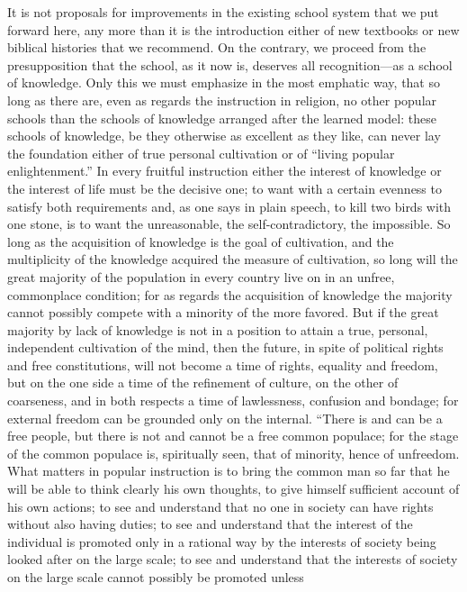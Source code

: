 \documentclass[12pt,a4paper,openany]{book}
\newcommand{\opage}[1]{\marginnote{\footnotesize\textit{[#1]}}}
\begin{document}
It is not proposals for improvements in the existing
school system that we put forward here, any more than
it is the introduction either of new textbooks or new
biblical histories that we recommend. On the contrary, we proceed from
the presupposition that the school, as it now is, deserves all
recognition---as a school of knowledge. Only this we must
emphasize in the most emphatic way, that so long as there are,
even as regards the instruction in religion, no
other popular schools than the schools of knowledge arranged
after the learned model: these schools of knowledge,
be they otherwise as excellent as they like,
can never lay the foundation either of true personal cultivation
or of ``living popular enlightenment.'' In every fruitful
instruction either the interest of knowledge or the interest of life
must be the decisive one; to want with a certain evenness
to satisfy both requirements and, as one
says in plain speech, to kill two birds with one stone,
is to want the unreasonable, the self-contradictory, the impossible.
\setcounter{footnote}{0}%
\opage{322}So long as the acquisition of knowledge is the goal of cultivation,
and the multiplicity of the knowledge acquired the measure of cultivation,
so long will the great majority of the population
in every country live on in an unfree, commonplace condition;
for as regards the acquisition of knowledge the
majority cannot possibly compete with a minority of the more
favored. But if the great majority by lack of
knowledge is not in a position to attain a true, personal,
independent cultivation of the mind, then the future, in spite of
political rights and free constitutions, will not become
a time of rights, equality and freedom, but on
the one side a time of the refinement of culture, on the other
of coarseness, and in both respects a time of lawlessness,
confusion and bondage; for external
freedom can be grounded only on the internal. ``There is
and can be a free people, but there is not and cannot
be a free common populace; for the stage of the common populace is, spiritually
seen, that of minority, hence of unfreedom. What matters
in popular instruction is to bring the common
man so far that he will be able to think clearly his own
thoughts, to give himself sufficient account of his own actions;
to see and understand that no one in society can
have rights without also having duties; to see
and understand that the interest of the individual is promoted only in a
rational way by the interests of society being looked after
on the large scale; to see and understand that the interests of society on the large scale cannot possibly be promoted unless
\end{document}
